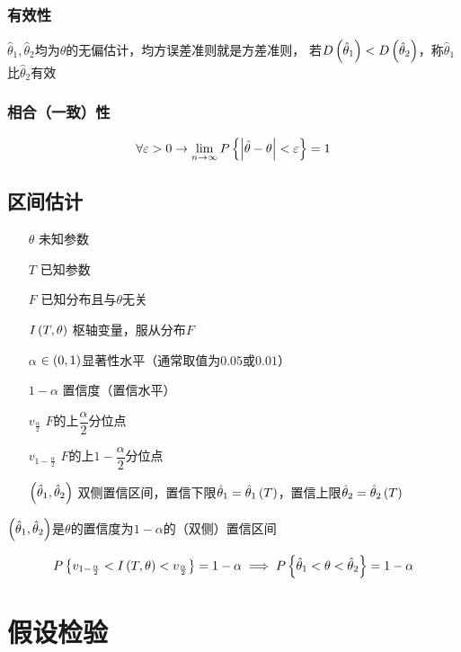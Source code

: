 \documentclass{article}
\begin{document}
\subsubsection{有效性}

$\hat\theta_1,\hat\theta_2$均为$\theta$的无偏估计，均方误差准则就是方差准则，
若$D\left(\hat\theta_1\right)<D\left(\hat\theta_2\right)$，称$\hat\theta_1$比$\hat\theta_2$有效

\subsubsection{相合（一致）性}

\[\forall\varepsilon>0\to\lim\limits_{n\to\infty}P\left\{\left|\hat\theta-\theta\right|<\varepsilon\right\}=1\]

\subsection{区间估计}

\begin{enumerate}
    \item [$\theta$] 未知参数
    \item [$T$] 已知参数
    \item [$F$] 已知分布且与$\theta$无关
    \item [$I\left(T,\theta\right)$] 枢轴变量，服从分布$F$
    \item [$\alpha$] $\in\left(0,1\right)$显著性水平（通常取值为$0.05$或$0.01$）
    \item [$1-\alpha$] 置信度（置信水平）
    \item [$v_\frac\alpha2$] $F$的上$\dfrac\alpha2$分位点
    \item [$v_{1-\frac\alpha2}$] $F$的上$1-\dfrac\alpha2$分位点
    \item [$\left(\hat\theta_1,\hat\theta_2\right)$] 双侧置信区间，置信下限$\hat\theta_1=\hat\theta_1\left(T\right)$，置信上限$\hat\theta_2=\hat\theta_2\left(T\right)$
\end{enumerate}

$\left(\hat\theta_1,\hat\theta_2\right)$是$\theta$的置信度为$1-\alpha$的（双侧）置信区间

\[P\left\{v_{1-\frac\alpha2}<I\left(T,\theta\right)<v_\frac\alpha2\right\}=1-\alpha\implies P\left\{\hat\theta_1<\theta<\hat\theta_2\right\}=1-\alpha\]

\section{假设检验}
\end{document}
